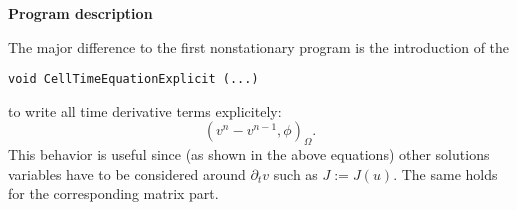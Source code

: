 %
%
\textbf{Program description}

The major difference to the first nonstationary program
is the introduction of the 
\begin{verbatim}
void CellTimeEquationExplicit (...) 
\end{verbatim}
to write all time derivative terms explicitely:
\begin{equation*}
(v^n - v^{n-1}, \phi)_{\Omega}.
\end{equation*}
This behavior is useful since (as shown in the above equations)
other solutions variables have to be considered
around $\partial_t v$ such as $J:=J(u)$. 
The same holds for the corresponding matrix part.


\vspace{0.2cm}
